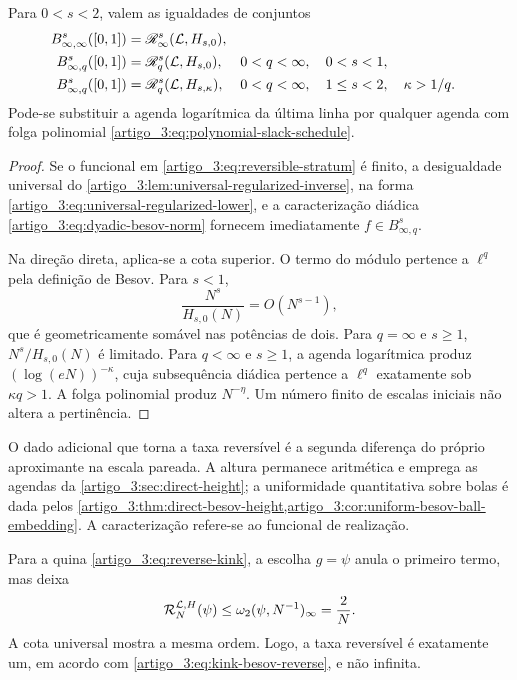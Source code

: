 \begin{theorem}\label{map:artigo_3:5.13}
\label{artigo_3:thm:complete-besov-reversibility}
Para $0<s<2$, valem as igualdades de conjuntos
\begin{align}
 B^s_{\infty,\infty}([0,1])
 &=\mathscr R_\infty^s(\mathcal{L},H_{s,0}),
 \label{artigo_3:eq:complete-reverse-endpoint}\\
 B^s_{\infty,q}([0,1])
 &=\mathscr R_q^s(\mathcal{L},H_{s,0}),
 &&0<q<\infty,\quad0<s<1,
 \label{artigo_3:eq:complete-reverse-subcritical}\\
 B^s_{\infty,q}([0,1])
 &=\mathscr R_q^s(\mathcal{L},H_{s,\kappa}),
 &&0<q<\infty,\quad1\le s<2,\quad\kappa>1/q.
 \label{artigo_3:eq:complete-reverse-critical}
\end{align}
Pode-se substituir a agenda logarítmica da última linha por qualquer agenda
com folga polinomial \eqref{artigo_3:eq:polynomial-slack-schedule}.
\end{theorem}

\begin{proof}
Se o funcional em \eqref{artigo_3:eq:reversible-stratum} é finito, a desigualdade
universal do \cref{artigo_3:lem:universal-regularized-inverse}, na forma
\eqref{artigo_3:eq:universal-regularized-lower}, e a caracterização diádica
\eqref{artigo_3:eq:dyadic-besov-norm} fornecem imediatamente
$f\in B^s_{\infty,q}$.

Na direção direta, aplica-se a cota superior. O termo do módulo pertence a
$\ell^q$ pela definição de Besov. Para $s<1$,
\[
 \frac{N^s}{H_{s,0}(N)}=O(N^{s-1}),
\]
que é geometricamente somável nas potências de dois. Para $q=\infty$ e
$s\ge1$, $N^s/H_{s,0}(N)$ é limitado. Para $q<\infty$ e $s\ge1$, a agenda
logarítmica produz $(\log(eN))^{-\kappa}$, cuja subsequência diádica pertence
a $\ell^q$ exatamente sob $\kappa q>1$. A folga polinomial produz
$N^{-\eta}$. Um número finito de escalas iniciais não altera a pertinência.
\end{proof}

O dado adicional que torna a taxa reversível é a segunda diferença do próprio
aproximante na escala pareada. A altura permanece aritmética e emprega as agendas
da \cref{artigo_3:sec:direct-height}; a uniformidade quantitativa sobre bolas é dada
pelos \cref{artigo_3:thm:direct-besov-height,artigo_3:cor:uniform-besov-ball-embedding}. A caracterização refere-se ao funcional de realização.

Para a quina \eqref{artigo_3:eq:reverse-kink}, a escolha $g=\psi$ anula o primeiro termo,
mas deixa
\begin{equation}
 \mathcal R_N^{\mathcal{L},H}(\psi)
 \le\omega_2(\psi,N^{-1})_\infty=\frac2N.
 \label{artigo_3:eq:kink-regularized-rate}
\end{equation}
A cota universal mostra a mesma ordem. Logo, a taxa reversível é exatamente
um, em acordo com \eqref{artigo_3:eq:kink-besov-reverse}, e não infinita.

